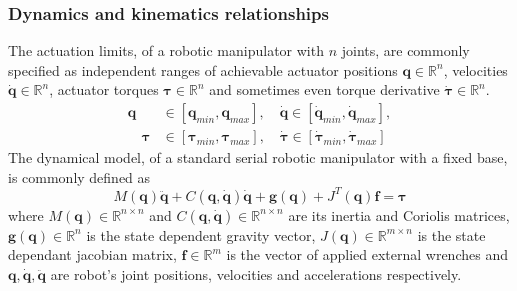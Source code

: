 \subsubsection{Dynamics and kinematics relationships}
\label{ch:robot_dyn_kin}
The actuation limits, of a robotic manipulator with $n$ joints, are commonly specified as independent ranges of achievable actuator positions $\bm{q}\in \mathbb{R}^n$, velocities $\dot{\bm{q}}\in \mathbb{R}^n$, actuator torques $\bm{\tau}\in \mathbb{R}^n$ and sometimes even torque derivative $\dot{\bm{\tau}}\in \mathbb{R}^n$.
\begin{subequations}
\begin{align}
\bm{q} &\in [ {\bm{q}}_{min}, {\bm{q}}_{max}], \quad\dot{\bm{q}} \in [\dot{\bm{q}}_{min},  \dot{\bm{q}}_{max}], \\
\quad\bm{\tau} &\in [\bm{\tau}_{min},  \bm{\tau}_{max}],
\quad\dot{\bm{\tau}} \in [\dot{\bm{\tau}}_{min},  \dot{\bm{\tau}}_{max}] \label{eq:dyn_limits:torque}
\end{align}
\label{eq:dyn_limits}
\end{subequations}
The dynamical model, of a standard serial robotic manipulator with a fixed base, is commonly defined as
\begin{equation}
M(\bm{q})\ddot{\bm{q}} + C(\bm{q},\dot{\bm{q}})\dot{\bm{q}} + \bm{g}(\bm{q}) + J^T(\bm{q})\bm{f} = \bm{\tau} 
\label{eq:dyn_model_rob}
\end{equation}
where $M(\bm{q}) \in \mathbb{R}^{n \times n}$ and $C(\bm{q},\dot{\bm{q}})\in \mathbb{R}^{n \times n}$ are its inertia and Coriolis matrices, $\bm{g} (\bm{q})\in \mathbb{R}^n$ is the state dependent gravity vector, $J(\bm{q}) \in \mathbb{R}^{m\times n}$ is the state dependant jacobian matrix, $\bm{f}\in \mathbb{R}^m $ is the vector of applied external wrenches and $\bm{q},\dot{\bm{q}},\ddot{\bm{q}}$ are robot's joint positions, velocities and accelerations respectively.

